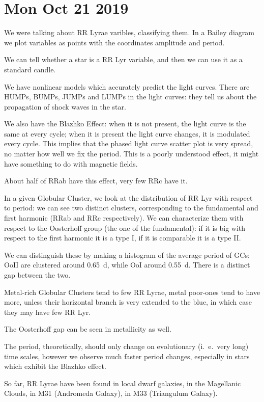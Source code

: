 \documentclass[main.tex]{subfiles}
\begin{document}
\section*{Mon Oct 21 2019}

We were talking about RR Lyrae varibles, classifying them.
In a Bailey diagram we plot variables as points with the coordinates amplitude and period.

We can tell whether a star is a RR Lyr variable, and then we can use it as a standard candle.

We have nonlinear models which accurately predict the light curves.
There are HUMPs, BUMPs, JUMPs and LUMPs in the light curves:
they tell us about the propagation of shock waves in the star.

We also have the Blazhko Effect: when it is not present, the light curve is the same at every cycle; when it is present the light curve changes, it is modulated every cycle.
This implies that the phased light curve scatter plot is very spread, no matter how well we fix the period. 
This is a poorly understood effect, it might have something to do with magnetic fields.

About half of RRab have this effect, very few RRc have it.

In a given Globular Cluster, we look at the distribution of RR Lyr with respect to period: we can see two distinct clusters, corresponding to the fundamental and first harmonic (RRab and RRc respectively).
We can characterize them with respect to the Oosterhoff group (the one of the fundamental): if it is big with respect to the first harmonic it is a type I, if it is comparable it is a type II.

We can distinguish these by making a histogram of the average period of GCs: OoII are clustered around \SI{.65}{d}, while OoI around \SI{.55}{d}. There is a distinct gap between the two. 

Metal-rich Globular Clusters tend to few RR Lyrae, metal poor-ones tend to have more, unless their horizontal branch is very extended to the blue, in which case they may have few RR Lyr. 

The Oosterhoff gap can be seen in metallicity as well. 

The period, theoretically, should only change on evolutionary (i.\ e.\ very long) time scales, however we observe much faster period changes, especially in stars which exhibit the Blazhko effect. 

So far, RR Lyrae have been found in local dwarf galaxies, in the Magellanic Clouds, in M31 (Andromeda
Galaxy), in M33 (Triangulum Galaxy).
\end{document}
